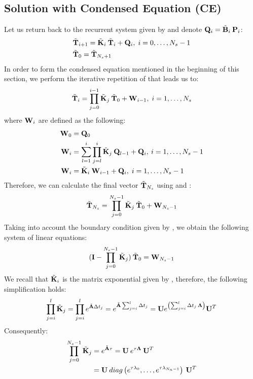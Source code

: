 \subsection{Solution with Condensed Equation (CE)} \label{sec:ce-solution}
Let us return back to the recurrent system given by  and denote \mbox{$\mathbf{Q}_i = \tilde{\mathbf{B}}_i \: \mathbf{P}_i$}:
\begin{align}
  & \tilde{\mathbf{T}}_{i + 1} = \tilde{\mathbf{K}}_i \: \tilde{\mathbf{T}}_i + \mathbf{Q}_i, \; i = 0, \dots, N_s - 1 \label{eq:ce-recurrent} \\
  & \tilde{\mathbf{T}}_0 = \tilde{\mathbf{T}}_{N_s + 1} \nonumber
\end{align}
In order to form the condensed equation mentioned in the beginning of this section, we perform the iterative repetition of  that leads us to:
\begin{equation} \label{eq:y-recurrent}
  \tilde{\mathbf{T}}_i = \prod_{j = 0}^{i - 1} \tilde{\mathbf{K}}_j \: \tilde{\mathbf{T}}_0 + \mathbf{W}_{i - 1}, \; i = 1, \dots, N_s
\end{equation}
where $\mathbf{W}_i$ are defined as the following:
\begin{align}
  \mathbf{W}_0 & = \mathbf{Q}_0 \nonumber \\
  \mathbf{W}_i & = \sum_{l = 1}^i \prod_{j = l}^i \tilde{\mathbf{K}}_j \: \mathbf{Q}_{l - 1} + \mathbf{Q}_i, \: i = 1, \dots, N_s - 1 \nonumber \\
  \mathbf{W}_i & = \tilde{\mathbf{K}}_i \: \mathbf{W}_{i - 1} + \mathbf{Q}_i, \; i = 1, \dots, N_s - 1 \label{eq:p-recurrent}
\end{align}
Therefore, we can calculate the final vector $\tilde{\mathbf{T}}_{N_s}$ using  and :
\[
  \tilde{\mathbf{T}}_{N_s} = \prod_{j = 0}^{N_s - 1} \tilde{\mathbf{K}}_j \: \tilde{\mathbf{T}}_0 + \mathbf{W}_{N_s - 1}
\]
Taking into account the boundary condition given by , we obtain the following system of linear equations:
\begin{equation} \label{eq:core-system}
  (\mathbf{I} - \prod_{j = 0}^{N_s - 1} \tilde{\mathbf{K}}_j) \: \tilde{\mathbf{T}}_0 = \mathbf{W}_{N_s - 1}
\end{equation}
We recall that $\tilde{\mathbf{K}}_i$ is the matrix exponential given by , therefore, the following simplification holds:
\[
  \prod_{j = i}^l \tilde{\mathbf{K}}_j = \prod_{j = i}^l e^{\tilde{\mathbf{A}} \Delta t_j} = e^{\tilde{\mathbf{A}} \sum_{j = i}^l \Delta t_j} = \mathbf{U} e^{\left( \sum_{j = i}^l \Delta t_j \: \mathbf{\Lambda} \right)} \mathbf{U}^T
\]
Consequently:
\begin{align*}
  \prod_{j = 0}^{N_s - 1} \tilde{\mathbf{K}}_j & = e^{\tilde{\mathbf{A}} \tau} = \mathbf{U} \: e^{\tau \mathbf{\Lambda}} \: \mathbf{U}^T \\
  & = \mathbf{U} \: diag \left( e^{\tau \lambda_0}, \dots, e^{\tau \lambda_{N_n - 1}} \right) \: \mathbf{U}^T
\end{align*}
